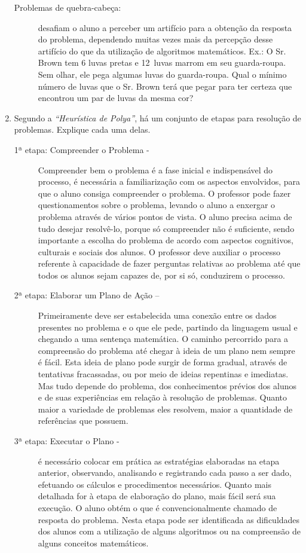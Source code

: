 \documentclass[a4paper, 12pt]{article}
\begin{document}
\begin{enumerate}
\begin{description}
    \item[Problemas de quebra-cabeça:] desafiam o aluno a perceber um artifício para a obtenção da resposta do problema, dependendo muitas vezes mais da percepção desse artifício do que da utilização de algoritmos matemáticos. 
      Ex.: O Sr. Brown tem 6 luvas pretas e 12 luvas marrom em seu guarda-roupa. Sem olhar, ele pega algumas luvas do guarda-roupa. Qual o mínimo número de luvas que o Sr. Brown terá que pegar para ter certeza que encontrou um par de luvas da mesma cor?
      
  \end{description}

\item Segundo a \emph{``Heurística de Polya''}, há um conjunto de etapas para resolução de problemas. Explique cada uma delas. \\
  \begin{description}
  \item[1ª etapa: Compreender o Problema -]
    Compreender bem o problema é a fase inicial e indispensável do processo, é necessária a familiarização com os aspectos envolvidos, para que o aluno consiga compreender o problema. O professor pode fazer questionamentos sobre o problema, levando o aluno a enxergar o problema através de vários pontos de vista. O aluno precisa acima de tudo desejar resolvê-lo, porque só compreender não é suficiente, sendo importante a escolha do problema de acordo com aspectos cognitivos, culturais e sociais dos alunos. O professor deve auxiliar o processo referente à capacidade de fazer perguntas relativas ao problema até que todos os alunos sejam capazes de, por si só, conduzirem o processo.
  \item[2ª etapa: Elaborar um Plano de Ação –]
    Primeiramente deve ser estabelecida uma conexão entre os dados presentes no problema e o que ele pede, partindo da linguagem usual e chegando a uma sentença matemática. O caminho percorrido para a compreensão do problema até chegar à ideia de um plano nem sempre é fácil. Esta ideia de plano pode surgir de forma gradual, através de tentativas fracassadas, ou por meio de ideias repentinas e imediatas. Mas tudo depende do problema, dos conhecimentos prévios dos alunos e de suas experiências em relação à resolução de problemas. Quanto maior a variedade de problemas eles resolvem, maior a quantidade de referências que possuem.
  \item[3ª etapa: Executar o Plano -]
    é necessário colocar em prática as estratégias elaboradas na etapa anterior, observando, analisando e registrando cada passo a ser dado, efetuando os cálculos e procedimentos necessários. Quanto mais detalhada for à etapa de elaboração do plano, mais fácil será sua execução. O aluno obtém o que é convencionalmente chamado de resposta do problema. Nesta etapa pode ser identificada as dificuldades dos alunos com a utilização de alguns algoritmos ou na compreensão de alguns conceitos matemáticos.

\end{description}
\end{enumerate}
\end{document}

